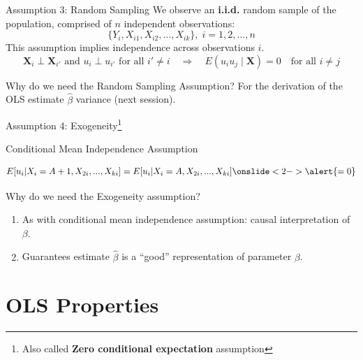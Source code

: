\documentclass[11pt, aspectratio = 169]{beamer}
\begin{document}
\begin{frame}{Assumption 3: Random Sampling}
    We observe an \textbf{i.i.d.} random sample of the population, comprised of $n$ independent observations: 
    \[
    \{Y_i, X_{i1}, X_{i2}, \ldots, X_{ik}\},\; i = 1, 2, \ldots, n
    \]
    \pause
    This assumption implies independence \alert{across} observations $i$.
    \[
    \mathbf{X}_i \perp \mathbf{X}_{i'} \text{ and } u_i \perp u_{i'} \text{ for all } i' \neq i \quad \Rightarrow \quad E(u_i u_j \mid \mathbf{X}) = 0 \quad \text{for all } i \neq j
    \]
    \begin{block}{Why do we need the Random Sampling Assumption?}
        \pause
        For the derivation of the OLS estimate $\hat{\beta}$ variance (next session).
    \end{block}
\end{frame}

\begin{frame}{Assumption 4: Exogeneity\footnote{Also called \textbf{Zero conditional expectation} assumption}}
\vspace{-0.5cm}
\begin{center}
    Conditional Mean Independence Assumption 
\end{center}
\vspace{-0.5cm}
\begin{align*}
        E[u_i | X_i = A+1, X_{2i}, ..., X_{ki}] = E[u_i | X_i = A, X_{2i}, ..., X_{ki}] \onslide<2->{\alert{=0}}
\end{align*}
\pause
\vspace{-0.7cm}
\begin{block}{Why do we need the Exogeneity assumption?}
    \pause
    \begin{enumerate}
        \item As with conditional mean independence assumption: causal interpretation of $\beta$.
        \pause
        \item Guarantees estimate $\hat{\beta}$ is a ``good'' representation of parameter $\beta$.
    \end{enumerate}
\end{block}
\end{frame}


\section{OLS Properties}
\end{document}
